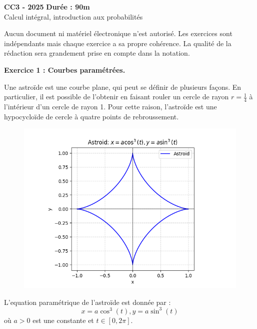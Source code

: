 \documentclass[a4paper,12pt]{article}
\begin{document}
\begin{center}
\textbf{CC3 - 2025} \hfill \textbf{Durée :  90m} \\
\vspace{1em}
{\Large Calcul intégral, introduction aux probabilités}

\vspace{1em}

\end{center}


Aucun document ni matériel électronique n’est autorisé. Les exercices sont indépendants mais chaque exercice a sa propre cohérence. La qualité de la rédaction sera grandement prise en
compte dans la notation.

\bigskip

\hline
\vspace{1em}

\noindent
\textbf{Exercice 1 : Courbes paramétrées.}

Une astroïde est une courbe plane, qui peut se définir de plusieurs
façons. En particulier, il est possible de l'obtenir en faisant
rouler un cercle de rayon $r = \frac14$ à l'intérieur d'un cercle de rayon 1. Pour cette raison, l'astroïde est une hypocycloïde de cercle à quatre points de rebroussement.

  \begin{figure}[hb]
\centering
\includegraphics[scale=.7]{./asteroid.png} 
  \label{pt graphic}
\end{figure}
L'equation paramétrique de l'astroïde est donnée par :
$$ x= a\cos^3(t), y = a\sin^3(t)$$
où $a>0$ est une constante
et  $t\in[0,2\pi]$. 
\end{document}
